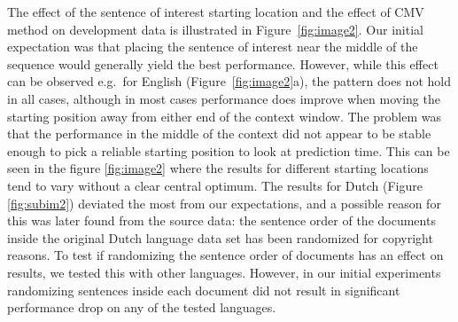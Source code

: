 \documentclass[11pt]{article}
\begin{document}
The effect of the sentence of interest starting location and the effect of CMV method on development data is illustrated in Figure~\ref{fig:image2}. Our initial expectation was that placing the sentence of interest near the middle of the sequence would generally yield the best performance. However, while this effect can be observed e.g.\ for English (Figure~\ref{fig:image2}a), the pattern does not hold in all cases, although in most cases performance does improve when moving the starting position away from either end of the context window. The problem was that the performance in the middle of the context did not appear to be stable enough to pick a reliable starting position to look at prediction time. This can be seen in the figure \ref{fig:image2} where the results for different starting locations tend to vary without a clear central optimum. The results for Dutch (Figure \ref{fig:subim2}) deviated the most from our expectations, and a possible reason for this was later found from the source data: the sentence order of the documents inside the original Dutch language data set has been randomized for copyright reasons. To test if randomizing the sentence order of documents has an effect on results, we tested this with other languages. However, in our initial experiments randomizing sentences inside each document did not result in significant performance drop on any of the tested languages. 
\end{document}
